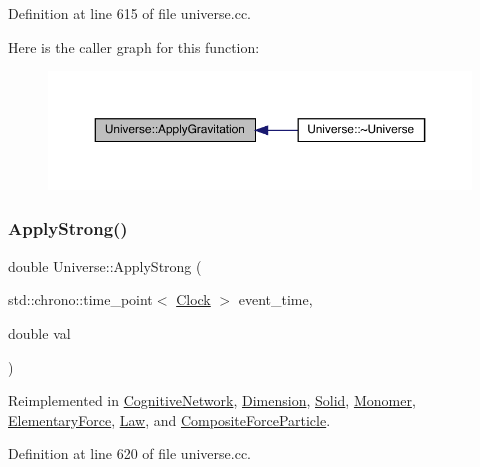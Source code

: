 Definition at line 615 of file universe.\+cc.

Here is the caller graph for this function\+:
\nopagebreak
\begin{figure}[H]
\begin{center}
\leavevmode
\includegraphics[width=350pt]{class_universe_a76c0b5e63c2a7d1988c44db341c3d64c_icgraph}
\end{center}
\end{figure}
\mbox{\label{class_universe_a906a88b37f10bfa630bef49dfd0e907a}} 
\subsubsection{\texorpdfstring{Apply\+Strong()}{ApplyStrong()}}
{\footnotesize\ttfamily double Universe\+::\+Apply\+Strong (\begin{DoxyParamCaption}\item[{std\+::chrono\+::time\+\_\+point$<$ \hyperlink{universe_8h_a0ef8d951d1ca5ab3cfaf7ab4c7a6fd80}{Clock} $>$}]{event\+\_\+time,  }\item[{double}]{val }\end{DoxyParamCaption})\hspace{0.3cm}{\ttfamily [virtual]}}



Reimplemented in \hyperlink{class_cognitive_network_a7a55750d3c42a277c4ffe04a87ab3b19}{Cognitive\+Network}, \hyperlink{class_dimension_a621e8f7f24db86e836c5b3da0f019290}{Dimension}, \hyperlink{class_solid_a0801ec0382bc509191575bcf9f5c83c1}{Solid}, \hyperlink{class_monomer_acba5091693082fdf2d28f1a5a4ae19a1}{Monomer}, \hyperlink{class_elementary_force_a8a16bff6b5df2b0ff918262bf6376ade}{Elementary\+Force}, \hyperlink{class_law_ab38659b209055df7e59f4bcd1b9e545a}{Law}, and \hyperlink{class_composite_force_particle_ac1464a04fbbca2d8927dfdbef0429878}{Composite\+Force\+Particle}.



Definition at line 620 of file universe.\+cc.

